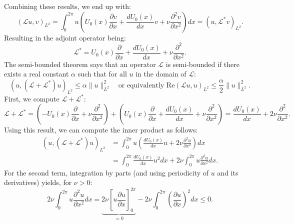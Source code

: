 Combining these results, we end up with:
\begin{equation}
	(\mathcal{L}u , v )_{L^2} =  \int_0^{2\pi} u \left ( U_0(x) \frac{\partial v}{\partial x} +  \frac{d U_0(x)}{d x} v  +  \nu \frac{\partial^2 v}{\partial x^2} \right) dx = (u, \mathcal{L}^* v)_{L^2}.
	\label{eq:adj_eq_final}
\end{equation}
Resulting in the adjoint operator being:
\begin{equation}
	\mathcal{L}^* = U_0(x) \frac{\partial}{\partial x} +  \frac{d U_0(x)}{d x}  +  \nu \frac{\partial^2}{\partial x^2}.
	\label{eq:adj_op_final}
\end{equation}
The semi-bounded theorem says that an operator $\mathcal{L}$ is semi-bounded if there exists a real constant $\alpha$ such that for all $u$ in the domain of $\mathcal{L}$:
\begin{equation}
	\left(u,\left(\mathcal{L}+\mathcal{L}^*\right) u\right)_{L^2} \leq \alpha\|u\|_{L^2}^2 \quad \text{or equivalently } \text{Re}(\mathcal{L}u, u)_{L^2} \leq \frac{\alpha}{2} \|u\|_{L^2}^2 \text{}.
	\label{eq:semi_bounded_def}
\end{equation}
First, we compute $\mathcal{L} + \mathcal{L}^*$:
\begin{equation}
	\mathcal{L} + \mathcal{L}^* = \left (  - U_0(x) \frac{\partial}{\partial x} + \nu \frac{\partial^2}{\partial x^2} \right) + \left  (U_0(x) \frac{\partial}{\partial x} +  \frac{d U_0(x)}{d x}  +  \nu \frac{\partial^2}{\partial x^2} \right ) = \frac{d U_0(x)}{d x}  +  2\nu \frac{\partial^2}{\partial x^2}.
	\label{eq:L_plus_L_star}
\end{equation}
Using this result, we can compute the inner product as follows:
\begin{equation}
	\begin{aligned}
		(u, (\mathcal{L}+\mathcal{L}^*)u)_{L^2} & = \int_0^{2\pi} u\left(\frac{dU_0(x)}{dx}u + 2\nu\frac{\partial^2 u}{\partial x^2}\right) dx        \\
		                                        & = \int_0^{2\pi} \frac{dU_0(x)}{dx}u^2 dx + 2\nu\int_0^{2\pi} u\frac{\partial^2 u}{\partial x^2} dx.
	\end{aligned}
	\label{eq:uLLu_expanded}
\end{equation}
For the second term, integration by parts (and using periodicity of $u$ and its derivatives) yields, for $\nu > 0$:
\begin{equation}
	2 \nu \int_0^{2 \pi} u \frac{\partial^2 u}{\partial x^2} dx = \underbrace{2\nu \left[u \frac{\partial u}{\partial x}\right]_0^{2\pi}}_{=0} - 2 \nu \int_0^{2 \pi} \left (\frac{\partial u}{\partial x} \right )^2 dx  \leq 0.
	\label{eq:diff_term_energy}
\end{equation}
